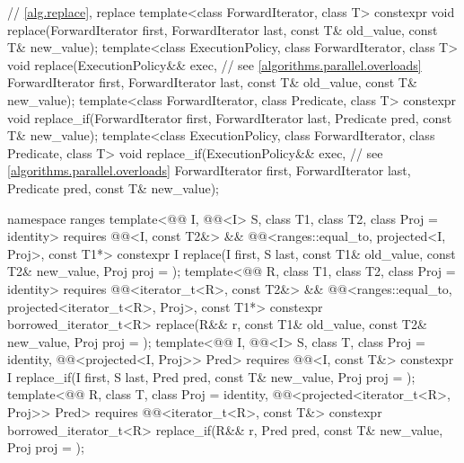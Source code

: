 \begin{codeblock}
{  // \ref{alg.replace}, replace
  template<class ForwardIterator, class T>
    constexpr void replace(ForwardIterator first, ForwardIterator last,
                           const T& old_value, const T& new_value);
  template<class ExecutionPolicy, class ForwardIterator, class T>
    void replace(ExecutionPolicy&& exec,                        // see \ref{algorithms.parallel.overloads}
                 ForwardIterator first, ForwardIterator last,
                 const T& old_value, const T& new_value);
  template<class ForwardIterator, class Predicate, class T>
    constexpr void replace_if(ForwardIterator first, ForwardIterator last,
                              Predicate pred, const T& new_value);
  template<class ExecutionPolicy, class ForwardIterator, class Predicate, class T>
    void replace_if(ExecutionPolicy&& exec,                     // see \ref{algorithms.parallel.overloads}
                    ForwardIterator first, ForwardIterator last,
                    Predicate pred, const T& new_value);

  namespace ranges {
    template<@@ I, @@<I> S, class T1, class T2, class Proj = identity>
      requires @@<I, const T2&> &&
               @@<ranges::equal_to, projected<I, Proj>, const T1*>
      constexpr I
        replace(I first, S last, const T1& old_value, const T2& new_value, Proj proj = {});
    template<@@ R, class T1, class T2, class Proj = identity>
      requires @@<iterator_t<R>, const T2&> &&
               @@<ranges::equal_to,
                                         projected<iterator_t<R>, Proj>, const T1*>
      constexpr borrowed_iterator_t<R>
        replace(R&& r, const T1& old_value, const T2& new_value, Proj proj = {});
    template<@@ I, @@<I> S, class T, class Proj = identity,
             @@<projected<I, Proj>> Pred>
      requires @@<I, const T&>
      constexpr I replace_if(I first, S last, Pred pred, const T& new_value, Proj proj = {});
    template<@@ R, class T, class Proj = identity,
             @@<projected<iterator_t<R>, Proj>> Pred>
      requires @@<iterator_t<R>, const T&>
      constexpr borrowed_iterator_t<R>
        replace_if(R&& r, Pred pred, const T& new_value, Proj proj = {});
  }

}
\end{codeblock}
